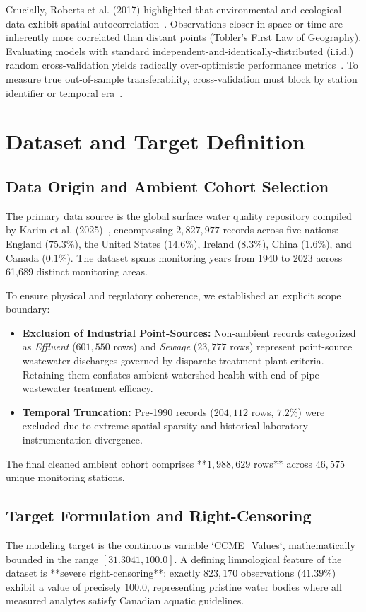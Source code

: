 \documentclass[journal,10pt,twocolumn]{IEEEtran}
\begin{document}
Crucially, Roberts et al. (2017) highlighted that environmental and ecological data exhibit spatial autocorrelation~\cite{roberts2017cross}. Observations closer in space or time are inherently more correlated than distant points (Tobler's First Law of Geography). Evaluating models with standard independent-and-identically-distributed (i.i.d.) random cross-validation yields radically over-optimistic performance metrics~\cite{meyer2019importance, kaufman2012leakage}. To measure true out-of-sample transferability, cross-validation must block by station identifier or temporal era~\cite{roberts2017cross}.

\section{Dataset and Target Definition}
\subsection{Data Origin and Ambient Cohort Selection}
The primary data source is the global surface water quality repository compiled by Karim et al. (2025)~\cite{karim2025comprehensive}, encompassing $2,827,977$ records across five nations: England ($75.3\%$), the United States ($14.6\%$), Ireland ($8.3\%$), China ($1.6\%$), and Canada ($0.1\%$). The dataset spans monitoring years from 1940 to 2023 across 61,689 distinct monitoring areas.

To ensure physical and regulatory coherence, we established an explicit scope boundary:
\begin{itemize}
    \item \textbf{Exclusion of Industrial Point-Sources:} Non-ambient records categorized as \textit{Effluent} ($601,550$ rows) and \textit{Sewage} ($23,777$ rows) represent point-source wastewater discharges governed by disparate treatment plant criteria. Retaining them conflates ambient watershed health with end-of-pipe wastewater treatment efficacy.
    \item \textbf{Temporal Truncation:} Pre-1990 records ($204,112$ rows, $7.2\%$) were excluded due to extreme spatial sparsity and historical laboratory instrumentation divergence.
\end{itemize}
The final cleaned ambient cohort comprises **$1,988,629$ rows** across $46,575$ unique monitoring stations.

\subsection{Target Formulation and Right-Censoring}
The modeling target is the continuous variable `CCME_Values`, mathematically bounded in the range $[31.3041, 100.0]$. A defining limnological feature of the dataset is **severe right-censoring**: exactly $823,170$ observations ($41.39\%$) exhibit a value of precisely $100.0$, representing pristine water bodies where all measured analytes satisfy Canadian aquatic guidelines.
\end{document}
